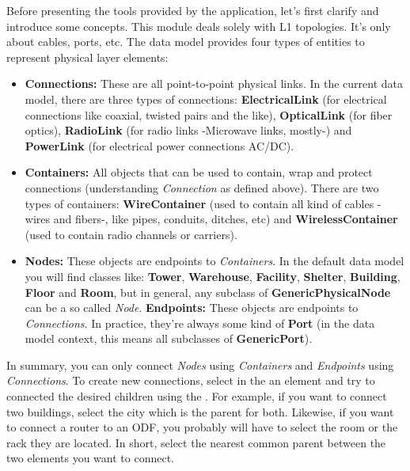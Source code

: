 \documentclass[a4paper]{article}
\begin{document}
		Before presenting the tools provided by the application, let's first clarify and introduce some concepts. This module deals solely with L1 topologies. It's only about cables, ports, etc. The data model provides four types of entities to represent physical layer elements:
		\begin{itemize}
			\item \textbf{Connections:} These are all point-to-point physical links. In the current data model, there are three	types of connections: \textbf{ElectricalLink} (for electrical connections like coaxial, twisted
			pairs and the like), \textbf{OpticalLink} (for fiber optics), \textbf{RadioLink} (for radio links -Microwave links, mostly-) and \textbf{PowerLink} (for electrical power connections AC/DC).
			\item \textbf{Containers:} All objects that can be used to contain, wrap and protect connections (understanding \textit{Connection} as defined above). There are two types of containers: \textbf{WireContainer} (used to contain all kind of cables -wires and fibers-, like pipes, conduits, ditches, etc) and \textbf{WirelessContainer} (used to contain radio channels or carriers).
			\item \textbf{Nodes:} These objects are endpoints to \textit{Containers}. In the default data model you will find classes like: \textbf{Tower}, \textbf{Warehouse}, \textbf{Facility}, \textbf{Shelter}, \textbf{Building}, \textbf{Floor} and \textbf{Room}, but in general, any subclass of \textbf{GenericPhysicalNode} can be a so called \textit{Node}.
			\textbf{Endpoints:} These objects are endpoints to \textit{Connections}. In practice, they're always some kind of \textbf{Port} (in the data model context, this means all subclasses of \textbf{GenericPort}).
		\end{itemize}
		In summary, you can only connect \textit{Nodes} using \textit{Containers} and \textit{Endpoints} using \textit{Connections}. To create new connections, select in the \textbf{} an element and try to connected the desired children using the . For example, if you want to connect two buildings, select the city which is the parent for both. Likewise, if you want to connect a router to an ODF, you probably will have to select the room or the rack they are located. In short, select the nearest common parent between the two elements you want to connect.
		
\end{document}
